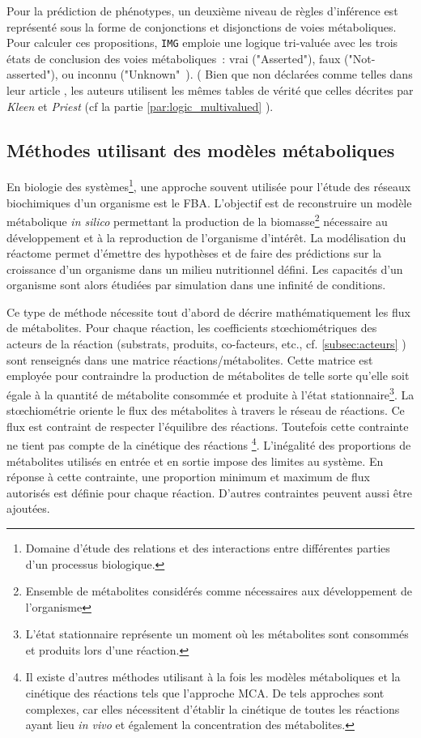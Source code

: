 \begin{refsegment}
    Pour la prédiction de phénotypes, un deuxième niveau de règles d’inférence est représenté sous la forme de conjonctions et disjonctions de voies métaboliques. Pour calculer ces propositions, \texttt{IMG} emploie une logique tri-valuée avec les trois états de conclusion des voies métaboliques : vrai ("Asserted"), faux ("Not-asserted"), ou inconnu ("Unknown" ).
     (
    Bien que non déclarées comme telles dans leur article , les auteurs utilisent les mêmes tables de vérité que celles décrites par \textit{Kleen} et \textit{Priest} (cf la partie \ref{par:logic_multivalued}  ). 
    
    \subsection{Méthodes utilisant des modèles métaboliques}
    
    En biologie des systèmes\footnote{Domaine d'étude des relations et des interactions entre différentes parties d'un processus biologique.}, une approche souvent utilisée pour l'étude des réseaux biochimiques d'un organisme est le \gls{FBA}\cite{orth2010flux}. L'objectif est de reconstruire un modèle métabolique \textit{in silico} permettant la production de la biomasse\footnote{Ensemble de métabolites considérés comme nécessaires aux développement de l'organisme} nécessaire au développement et à la reproduction de l'organisme d'intérêt. La modélisation du réactome permet d'émettre des hypothèses et de faire des prédictions sur la croissance d'un organisme dans un milieu nutritionnel défini. Les capacités d'un organisme sont alors étudiées par simulation dans une infinité de conditions.
    
    Ce type de méthode nécessite tout d’abord de décrire mathématiquement les flux de métabolites. Pour chaque réaction, les coefficients stœchiométriques des acteurs de la réaction (substrats, produits, co-facteurs, etc., cf. \cref{subsec:acteurs} ) sont renseignés dans une matrice réactions/métabolites. Cette matrice est employée pour contraindre la production de métabolites de telle sorte qu’elle soit égale à la quantité de métabolite consommée et produite à l’état stationnaire\footnote{L'état stationnaire représente un moment où les métabolites sont consommés et produits lors d'une réaction.}. La stœchiométrie oriente le flux des métabolites à travers le réseau de réactions. Ce flux est contraint de respecter l’équilibre des réactions. Toutefois cette contrainte ne tient pas compte de la cinétique des réactions \cite{covert2001metabolic,edwards2002metabolic}\footnote{Il existe d'autres méthodes utilisant à la fois les modèles métaboliques et la cinétique des réactions tels que l'approche \gls{MCA}. De tels approches sont complexes, car elles nécessitent d'établir la cinétique de toutes les réactions ayant lieu \textit{in vivo} et également la concentration des métabolites.}. L’inégalité des proportions de métabolites utilisés en entrée et en sortie impose des limites au système. En réponse à cette contrainte, une proportion minimum et maximum de flux autorisés est définie pour chaque réaction. D’autres contraintes peuvent aussi être ajoutées.
    

\end{refsegment}
